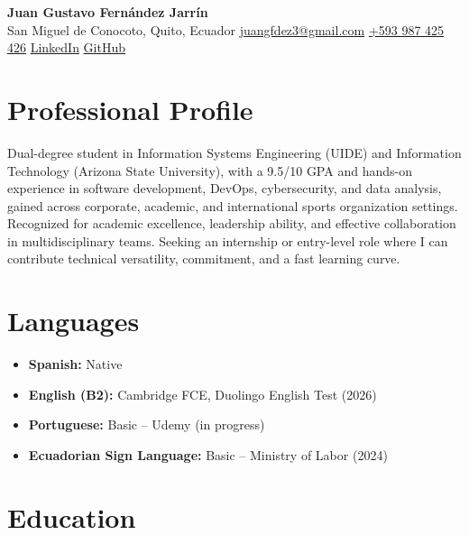 \documentclass[10.5pt]{article}
\begin{document}

\begin{center}
    {\LARGE \textbf{Juan Gustavo Fernández Jarrín}}\\[0.25em]
    {\small
    San Miguel de Conocoto, Quito, Ecuador \;\textbullet\;
    \href{mailto:juangfdez3@gmail.com}{juangfdez3@gmail.com} \;\textbullet\;
    \href{https://wa.link/ypqhpl}{+593 987 425 426} \;\textbullet\;
    \href{https://www.linkedin.com/in/TU-USUARIO}{LinkedIn} \;\textbullet\;
    \href{https://github.com/TU-USUARIO}{GitHub}
    }
\end{center}

\vspace{0.3em}

\section*{Professional Profile}
Dual-degree student in Information Systems Engineering (UIDE) and Information Technology (Arizona State University), with a 9.5/10 GPA and hands-on experience in software development, DevOps, cybersecurity, and data analysis, gained across corporate, academic, and international sports organization settings. Recognized for academic excellence, leadership ability, and effective collaboration in multidisciplinary teams. Seeking an internship or entry-level role where I can contribute technical versatility, commitment, and a fast learning curve.

\section*{Languages}
\begin{itemize}
    \item \textbf{Spanish:} Native
    \item \textbf{English (B2):} Cambridge FCE, Duolingo English Test (2026)
    \item \textbf{Portuguese:} Basic -- Udemy (in progress)
    \item \textbf{Ecuadorian Sign Language:} Basic -- Ministry of Labor (2024)
\end{itemize}

\section*{Education}
\end{document}
